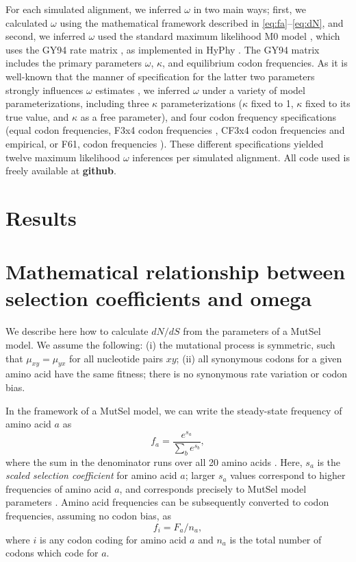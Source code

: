 \documentclass[11pt]{article}
\begin{document}
For each simulated alignment, we inferred $\omega$ in two main ways; first, we calculated $\omega$ using the mathematical framework described in \eqref{eq:fa}--\eqref{eq:dN}, and second, we inferred $\omega$ used the standard maximum likelihood M0 model \cite{NielsenYang1998}, which uses the GY94 rate matrix \cite{GoldmanYang1994}, as implemented in HyPhy \cite{KosakovskyPondetal2005}. The GY94 matrix includes the primary parameters $\omega$, $\kappa$, and equilibrium codon frequencies. As it is well-known that the manner of specification for the latter two parameters strongly influences $\omega$ estimates \cite{YN00, Yang2006}, we inferred $\omega$ under a variety of model parameterizations, including three $\kappa$ parameterizations ($\kappa$ fixed to 1, $\kappa$ fixed to its true value, and $\kappa$ as a free parameter), and four codon frequency specifications (equal codon frequencies,  F3x4 codon frequencies \cite{MuseGaut1994}, CF3x4 codon frequencies \cite{Pond2010} and empirical, or F61, codon frequencies \cite{GoldmanYang1994}). These different specifications yielded twelve maximum likelihood $\omega$ inferences per simulated alignment. All code used is freely available at \textbf{github}.


\section*{Results}


\section*{Mathematical relationship between selection coefficients and omega}


We describe here how to calculate $dN/dS$ from the parameters of a MutSel model. We assume the following: (i) the mutational process is symmetric, such that $\mu_{xy}=\mu_{yx}$ for all nucleotide pairs $xy$; (ii) all synonymous codons for a given amino acid have the same fitness; there is no synonymous rate variation or codon bias.

In the framework of a MutSel model, we can write the steady-state frequency of amino acid $a$ as
\begin{equation}\label{eq:fa}
 f_a=\frac{e^{s_a}}{\sum_b e^{s_b}},
\end{equation}
where the sum in the denominator runs over all 20 amino acids \cite{SellaHirsh2005}. Here, $s_a$ is the \emph{scaled selection coefficient} for amino acid $a$; larger $s_a$ values correspond to higher frequencies of amino acid $a$, and corresponds precisely to MutSel model parameters \cite{HalpernBruno1998}. Amino acid frequencies can be subsequently converted to codon frequencies, assuming no codon bias, as 
\begin{equation}
f_i = F_a / n_a ,	
\end{equation} where $i$ is any codon coding for amino acid $a$ and $n_a$ is the total number of codons which code for $a$.
\end{document}
